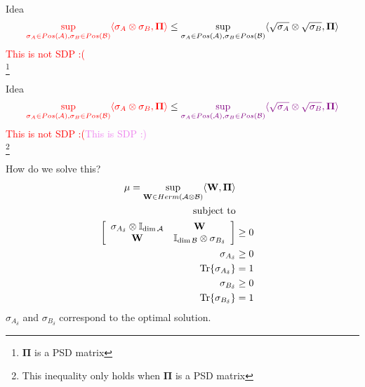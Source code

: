 \documentclass{beamer}
\begin{document}
    \begin{frame}{Idea}
        $$
            \textcolor{red}{\sup\limits_{\mathbf{\sigma}_{A}\in Pos(\mathcal{A}), \mathbf{\sigma}_{B}\in Pos(\mathcal{B})}\langle\mathbf{\sigma}_{A}\otimes\mathbf{\sigma}_{B}, \mathbf{\Pi}\rangle} \le \sup\limits_{\mathbf{\sigma}_{A}\in Pos(\mathcal{A}), \mathbf{\sigma}_{B}\in Pos(\mathcal{B})}\langle\sqrt{\mathbf{\sigma}_{A}}\otimes\sqrt{\mathbf{\sigma}_{B}}, \mathbf{\Pi}\rangle
        $$
        \textcolor{red}{This is not SDP :(} \\
        \footnote{$\mathbf{\Pi}$ is a PSD matrix}
    \end{frame}
    
    \begin{frame}{Idea}
        $$
            \textcolor{red}{\sup\limits_{\mathbf{\sigma}_{A}\in Pos(\mathcal{A}), \mathbf{\sigma}_{B}\in Pos(\mathcal{B})}\langle\mathbf{\sigma}_{A}\otimes\mathbf{\sigma}_{B}, \mathbf{\Pi}\rangle} \le \textcolor{violet}{\sup\limits_{\mathbf{\sigma}_{A}\in Pos(\mathcal{A}), \mathbf{\sigma}_{B}\in Pos(\mathcal{B})}\langle\sqrt{\mathbf{\sigma}_{A}}\otimes\sqrt{\mathbf{\sigma}_{B}}, \mathbf{\Pi}\rangle}
        $$
        \textcolor{red}{This is not SDP :(}\hfill\textcolor{violet}{This is SDP :)} \\
        \footnote{This inequality only holds when $\mathbf{\Pi}$ is a PSD matrix}
    \end{frame}
    
    \begin{frame}{How do we solve this?}
        \begin{align*}
            \mu = \sup\limits_{\mathbf{W}\in Herm(\mathcal{A}\otimes\mathcal{B})}\langle\mathbf{W}, \mathbf{\Pi}\rangle \\
            \mbox{subject to} \\
            \left[\begin{array}{cc}
                \mathbf{\sigma}_{A_{\delta}}\otimes\mathbb{I}_{\dim\mathcal{A}} & \mathbf{W} \\
                \mathbf{W} & \mathbb{I}_{\dim\mathcal{B}}\otimes\mathbf{\sigma}_{B_{\delta}}
            \end{array}\right] &\ge 0 \\
            \mathbf{\sigma}_{A_{\delta}} &\ge 0 \\
            \Tr{\mathbf{\sigma}_{A_{\delta}}} &= 1 \\
            \mathbf{\sigma}_{B_{\delta}} &\ge 0 \\
            \Tr{\mathbf{\sigma}_{B_{\delta}}} &= 1
        \end{align*}
        $\sigma_{A_{\delta}}$ and $\sigma_{B_{\delta}}$ correspond to the optimal solution.
    \end{frame}
    
\end{document}
